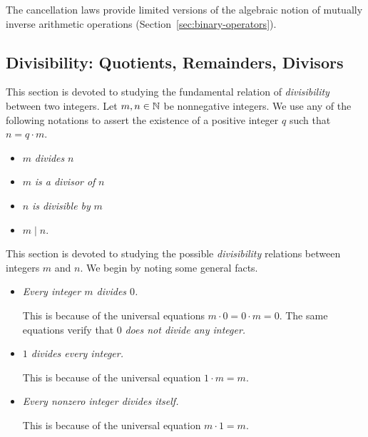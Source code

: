 \noindent
The cancellation laws provide limited versions of the algebraic notion of mutually inverse arithmetic operations (Section~\ref{sec:binary-operators}).


\subsection{Divisibility: Quotients, Remainders, Divisors}
\label{sec:divisibility}
 

This section is devoted to studying the fundamental relation of {\em divisibility} between two integers.  Let $m, n \in \mathbb{N}$ be nonnegative integers.  We use any of the following notations to assert the existence of a positive integer $q$ such that $n = q \cdot m$.
 
\begin{itemize}
\item
$m$ {\it divides} $n$
\medskip\item
$m$ {\it is a divisor of} $n$
\medskip\item
$n$ {\it is divisible by} $m$
\medskip\item
$m \mid n$.
\end{itemize}
This section is devoted to studying the possible {\it divisibility} relations between integers $m$ and $n$.  We begin by noting some general facts.
\begin{itemize}
\item
{\em Every integer $m$ divides $0$.}

\smallskip

This is because of the universal equations $m \cdot 0 = 0 \cdot m = 0$.   The same equations verify that $0$ {\em does not divide any integer.}

\medskip\item
{\em $1$ divides every integer.}

\smallskip

This is because of the universal equation $1 \cdot m = m$.
\medskip\item
{\em Every nonzero integer divides itself.}

\smallskip

This is because of the universal equation $m \cdot 1 = m$.
\end{itemize}

